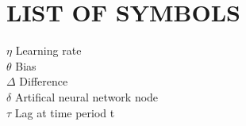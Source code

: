 \newpage
\section*{\fontsize{14pt}{0pt}\bfseries LIST OF SYMBOLS}
\hspace{0mm}$\eta$\hspace{12mm} Learning rate\\
\hspace{4mm}$\theta$\hspace{12mm} Bias\\
\hspace{4mm}$\Delta$\hspace{12mm} Difference\\
\hspace{4mm}$\delta$\hspace{12mm} Artifical neural network node\\
\hspace{4mm}$\tau$\hspace{12mm} Lag at time period t
